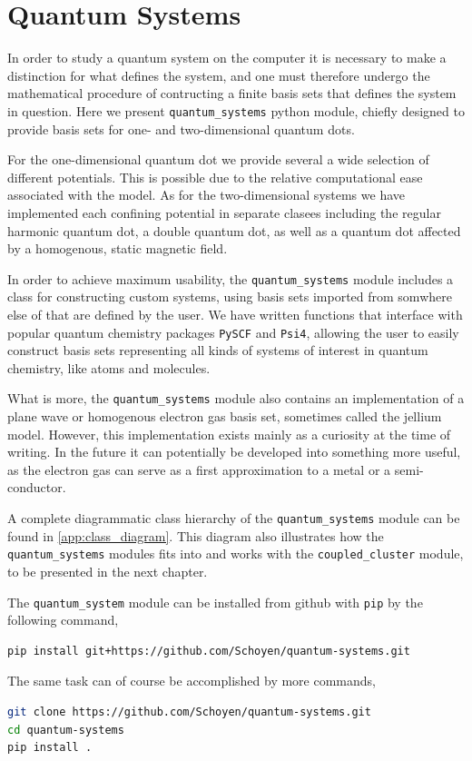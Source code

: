 \chapter{Quantum Systems}
\label{ch:impl_quantum_systems}

In order to study a quantum system on the computer it is necessary to 
make a distinction for what defines the system, and one must therefore undergo the
mathematical procedure of contructing a finite basis sets that defines the system in 
question. Here we present \lstinline{quantum_systems} python module, chiefly designed to 
provide basis sets for one- and two-dimensional quantum dots.

For the one-dimensional quantum dot we provide several a wide selection of different
potentials. This is possible due to the relative computational ease associated with the 
model. As for the two-dimensional 
systems we have implemented each confining potential in separate clasees including
the regular harmonic quantum dot, a 
double quantum dot, as well as a quantum dot affected by a homogenous, static  magnetic 
field.

In order to achieve maximum usability, the \lstinline{quantum_systems} module
includes a class for constructing custom systems, using basis sets imported from 
somwhere else of that are defined by the user.
We have written functions that interface with popular quantum chemistry packages
\lstinline{PySCF}\cite{PYSCF} 
and \lstinline{Psi4}\cite{parrish2017psi4},
allowing the user to easily construct basis sets 
representing all kinds of systems of interest in quantum chemistry, like atoms and 
molecules. 

What is more, the \lstinline{quantum_systems} module also contains an implementation of 
a plane wave or homogenous electron gas basis set, sometimes called the 
jellium model. However, this implementation exists mainly as 
a curiosity at the time of writing. In the future it can potentially
be developed into something more useful,
as the electron gas can serve as a first approximation to a metal or a semi-conductor.

A complete diagrammatic class hierarchy of the \lstinline{quantum_systems} module 
can be found in \autoref{app:class_diagram}. This diagram also illustrates how 
the \lstinline{quantum_systems} modules fits into and works with the 
\lstinline{coupled_cluster} module, to be presented in the next chapter.

The \lstinline{quantum_system} module can be installed from github with \lstinline{pip}
by the following command,
\begin{lstlisting}[language=bash]
pip install git+https://github.com/Schoyen/quantum-systems.git
\end{lstlisting}
The same task can of course be accomplished by more commands,
\begin{lstlisting}[language=bash]
git clone https://github.com/Schoyen/quantum-systems.git
cd quantum-systems
pip install .
\end{lstlisting}

